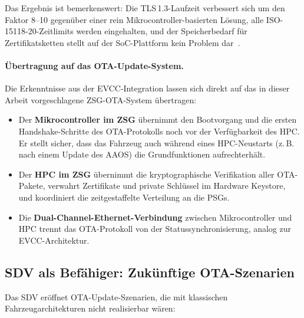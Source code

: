 ﻿\documentclass[12pt,a4paper,twoside]{article}
\begin{document}
Das Ergebnis ist bemerkenswert: Die TLS\,1.3-Laufzeit verbessert sich
um den Faktor 8--10 gegenüber einer rein Mikrocontroller-basierten Lösung,
alle ISO-15118-20-Zeitlimits werden eingehalten, und der Speicherbedarf für
Zertifikatsketten stellt auf der SoC-Plattform kein Problem dar~\cite{schneider2026ladekomm}.

\paragraph{Übertragung auf das OTA-Update-System.}
Die Erkenntnisse aus der EVCC-Integration lassen sich direkt auf das
in dieser Arbeit vorgeschlagene ZSG-OTA-System übertragen:

\begin{itemize}
  \item Der \textbf{Mikrocontroller im ZSG} übernimmt den Bootvorgang und
    die ersten Hand\-shake-Schritte des OTA-Protokolls noch vor der Verfügbarkeit
    des HPC. Er stellt sicher, dass das Fahrzeug auch während eines HPC-Neustarts
    (z.\,B. nach einem Update des AAOS) die Grundfunktionen aufrechterhält.
  \item Der \textbf{HPC im ZSG} übernimmt die kryptographische Verifikation
    aller OTA-Pakete, verwahrt Zertifikate und private Schlüssel im Hardware
    Keystore, und koordiniert die zeitgestaffelte Verteilung an die PSGs.
  \item Die \textbf{Dual-Channel-Ethernet-Verbindung} zwischen Mikrocontroller
    und HPC trennt das OTA-Protokoll von der Statussynchronisierung, analog
    zur EVCC-Architek\-tur.
\end{itemize}

\subsection{SDV als Befähiger: Zukünftige OTA-Szenarien}
\label{subsec:sdv_zukunft}

Das SDV eröffnet OTA-Update-Szenarien, die mit klassischen Fahrzeugarchitekturen
nicht realisierbar wären:
\end{document}
